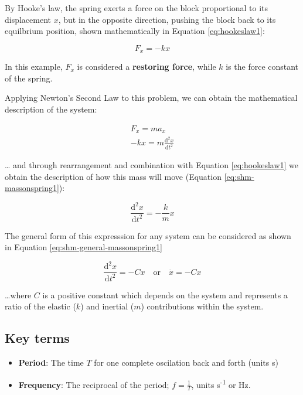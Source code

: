 \documentclass[
]{book}
\providecommand{\tightlist}{%
  \setlength{\itemsep}{0pt}\setlength{\parskip}{0pt}}
\begin{document}
By Hooke's law, the spring exerts a force on the block proportional to its displacement \(x\), but in the opposite direction, pushing the block back to its equilbrium position, shown mathematically in Equation \eqref{eq:hookeslaw1}:

\begin{equation}
F_x = -kx
\label{eq:hookeslaw1}
\end{equation}

In this example, \(F_x\) is considered a \textbf{restoring force}, while \(k\) is the force constant of the spring.

Applying Newton's Second Law to this problem, we can obtain the mathematical description of the system:

\begin{equation}
\begin{aligned}
F_x = ma_x \\
-kx = m\frac{\textrm{d}^2 x}{\textrm{d} t^2}
\end{aligned}
\end{equation}

\ldots{} and through rearrangement and combination with Equation \eqref{eq:hookeslaw1} we obtain the description of how this mass will move (Equation \eqref{eq:shm-massonspring1}):

\begin{equation}
\frac{\textrm{d}^2 x}{\textrm{d} t^2} = -\frac{k}{m}x
\label{eq:shm-massonspring1}
\end{equation}

The general form of this expresssion for any system can be considered as shown in Equation \eqref{eq:shm-general-massonspring1}

\begin{equation}
\frac{\textrm{d}^2 x}{\textrm{d} t^2} = -Cx \quad\mathrm{or}\quad\ddot{x} = -Cx
\label{eq:shm-general-massonspring1}
\end{equation}

\ldots where \(C\) is a positive constant which depends on the system and represents a ratio of the elastic (\(k\)) and inertial (\(m\)) contributions within the system.

\hypertarget{key-terms}{%
\subsection{Key terms}\label{key-terms}}

\begin{itemize}
\tightlist
\item
  \textbf{Period}: The time \(T\) for one complete oscilation back and forth (units s)
\item
  \textbf{Frequency}: The reciprocal of the period; \(f = \frac{1}{T}\), units s\textsuperscript{-1} or Hz.
\end{itemize}
\end{document}
